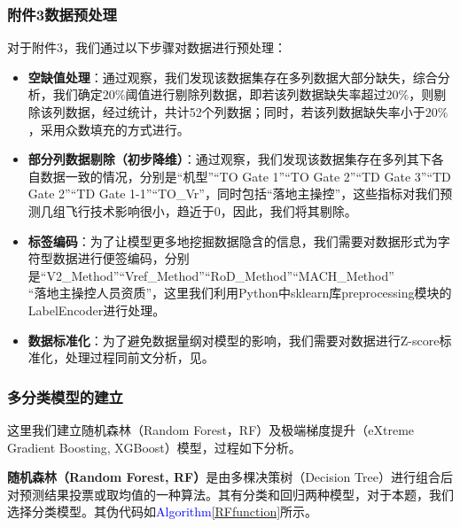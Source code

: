 \documentclass{MathorCupModeling}
\begin{document}
	\subsubsection{附件3数据预处理}
	对于附件3，我们通过以下步骤对数据进行预处理：
	\begin{itemize}
		\item \textbf{空缺值处理}：通过观察，我们发现该数据集存在多列数据大部分缺失，综合分析，我们确定$20\%$阈值进行剔除列数据，即若该列数据缺失率超过$20\%$，则剔除该列数据，经过统计，共计52个列数据；同时，若该列数据缺失率小于$20\%$，采用众数填充的方式进行。
		\item \textbf{部分列数据剔除（初步降维）}：通过观察，我们发现该数据集存在多列其下各自数据一致的情况，分别是“机型”“TO Gate 1”“TO Gate 2”“TD Gate 3”“TD Gate 2”“TD Gate 1-1”“TO\_Vr”，同时包括“落地主操控”，这些指标对我们预测几组飞行技术影响很小，趋近于0，因此，我们将其剔除。
		\item \textbf{标签编码}：为了让模型更多地挖掘数据隐含的信息，我们需要对数据形式为字符型数据进行便签编码，分别是“V2\_Method”“Vref\_Method”“RoD\_Method”“MACH\_Method”\\“落地主操控人员资质”，这里我们利用Python中sklearn库preprocessing模块的LabelEncoder进行处理。
		\item \textbf{数据标准化}：为了避免数据量纲对模型的影响，我们需要对数据进行Z-score标准化，处理过程同前文分析，见\textcolor{blue}{}。
	\end{itemize}
	\subsubsection{多分类模型的建立}\label{RF-XGBoost}
	这里我们建立随机森林（Random Forest，RF）及极端梯度提升（eXtreme Gradient Boosting, XGBoost）模型，过程如下分析。
	
	\textbf{随机森林（Random Forest, RF）}是由多棵决策树（Decision Tree）进行组合后对预测结果投票或取均值的一种算法\textcolor{blue}{\cite{Paper:随机森林}}。其有分类和回归两种模型，对于本题，我们选择分类模型。其伪代码如\textcolor{blue}{Algorithm\ref{RFfunction}}所示。
	
\end{document}
